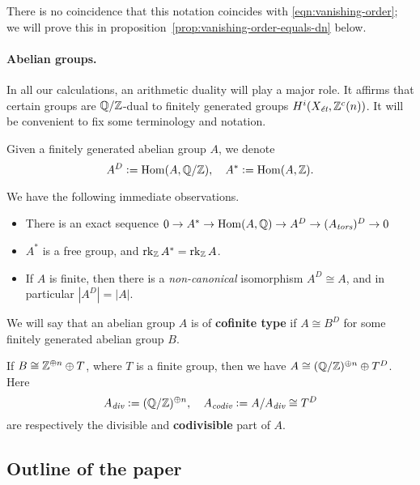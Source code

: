 \documentclass{article}
\numberwithin{equation}{section}
\begin{document}
There is no coincidence that this notation coincides with
\eqref{eqn:vanishing-order}; we will prove this
in proposition~\ref{prop:vanishing-order-equals-dn} below.

\paragraph{Abelian groups.}
In all our calculations, an arithmetic duality
\cite[Theorem~I]{Beshenov-Weil-etale-1} will play a major role. It affirms that
certain groups are $\QQ/\ZZ$-dual to finitely generated groups
$H^i (X_\et, \ZZ^c(n))$. It will be convenient to fix some terminology and
notation.

\begin{definition}
  \label{dfn:A-D-and-A-star}
  Given a finitely generated abelian group $A$, we denote
  \[ A^D \dfn \Hom (A, \QQ/\ZZ), \quad
    A^* \dfn \Hom (A, \ZZ). \]
\end{definition}

\begin{remark}
  \label{rmk:A-D-and-A-star}
  We have the following immediate observations.
  \begin{itemize}
  \item There is an exact sequence
    $0 \to A^* \to \Hom (A,\QQ) \to A^D \to (A_\tors)^D \to 0$

  \item $A^*$ is a free group, and $\rk_\ZZ A^* = \rk_\ZZ A$.

  \item If $A$ is finite, then there is a \emph{non-canonical} isomorphism
    $A^D \cong A$, and in particular $|A^D| = |A|$.
  \end{itemize}
\end{remark}

\begin{definition}
  We will say that an abelian group $A$ is of \textbf{cofinite type} if
  $A \cong B^D$ for some finitely generated abelian group $B$.
\end{definition}

If $B \cong \ZZ^{\oplus n} \oplus T$, where $T$ is a finite group, then we have
$A \cong (\QQ/\ZZ)^{\oplus n} \oplus T^D$. Here
\[ A_\div \dfn (\QQ/\ZZ)^{\oplus n}, \quad
  A_\codiv \dfn A/A_\div \cong T^D \]
are respectively the divisible and \textbf{codivisible} part of $A$.

\subsection*{Outline of the paper}
\end{document}
